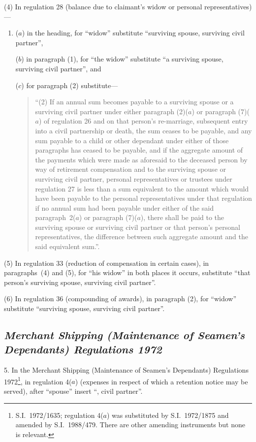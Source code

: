 \documentclass[12pt,a4paper]{article}
\begin{document}
(4) In regulation 28 (balance due to claimant’s widow or personal representatives)—
\begin{enumerate}\item[]
($a$) in the heading, for “widow” substitute “surviving spouse, surviving civil partner”,

($b$) in paragraph (1), for “the widow” substitute “a surviving spouse, surviving civil partner”, and

($c$) for paragraph (2) substitute—
\begin{quotation}
“(2) If an annual sum becomes payable to a surviving spouse or a surviving civil partner under either paragraph (2)($a$)  or paragraph (7)($a$)  of regulation 26 and on that person’s re-marriage, subsequent entry into a civil partnership or death, the sum ceases to be payable, and any sum payable to a child or other dependant under either of those paragraphs has ceased to be payable, and if the aggregate amount of the payments which were made as aforesaid to the deceased person by way of retirement compensation and to the surviving spouse or surviving civil partner, personal representatives or trustees under regulation 27 is less than a sum equivalent to the amount which would have been payable to the personal representatives under that regulation if no annual sum had been payable under either of the said paragraph~2($a$)  or paragraph (7)($a$), there shall be paid to the surviving spouse or surviving civil partner or that person’s personal representatives, the difference between such aggregate amount and the said equivalent sum.”.
\end{quotation}
\end{enumerate}

(5) In regulation 33 (reduction of compensation in certain cases), in paragraphs~(4) and (5), for “his widow” in both places it occurs, substitute “that person’s surviving spouse, surviving civil partner”.

(6) In regulation 36 (compounding of awards), in paragraph (2), for “widow” substitute “surviving spouse, surviving civil partner”.

\subsection*{\itshape Merchant Shipping (Maintenance of Seamen’s Dependants) Regulations 1972}

5.  In the Merchant Shipping (Maintenance of Seamen’s Dependants) Regulations 1972\footnote{S.I.~1972/1635; regulation 4($a$)  was substituted by S.I.~1972/1875 and amended by S.I.~1988/479. There are other amending instruments but none is relevant.}, in regulation 4($a$)  (expenses in respect of which a retention notice may be served), after “spouse” insert “, civil partner”.
\end{document}
